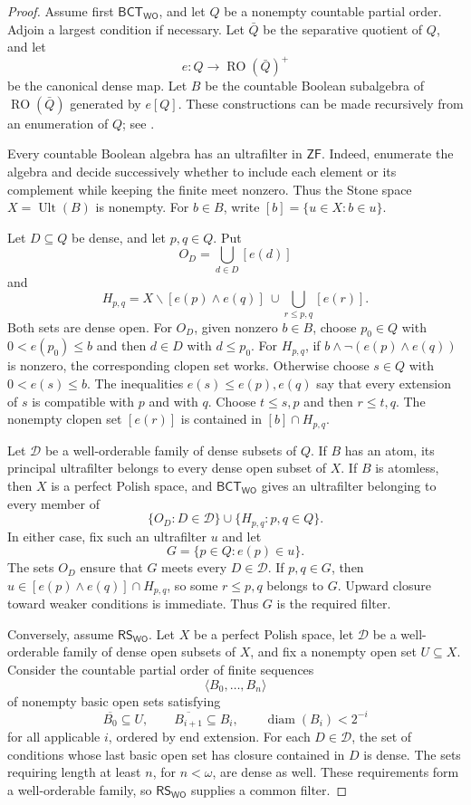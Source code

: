 \documentclass[11pt,reqno]{amsart}
\newcommand{\WO}{\mathsf{WO}}
\newcommand{\RO}{\operatorname{RO}}
\newcommand{\Ult}{\operatorname{Ult}}
\newcommand{\diam}{\operatorname{diam}}
\newcommand{\BCTWO}{\mathsf{BCT}_{\WO}}
\newcommand{\RSWO}{\mathsf{RS}_{\WO}}
\theoremstyle{plain}
\theoremstyle{definition}
\theoremstyle{remark}
\begin{document}
\begin{proof}
Assume first $\BCTWO$, and let $Q$ be a nonempty countable partial order.
Adjoin a largest condition if necessary.  Let $\bar Q$ be the separative
quotient of $Q$, and let
\[
 e:Q\longrightarrow\RO(\bar Q)^+
\]
be the canonical dense map.  Let $B$ be the countable Boolean subalgebra of
$\RO(\bar Q)$ generated by $e[Q]$.  These constructions can be made
recursively from an enumeration of $Q$; see \cite[Chapter 14]{Jech2003}.

Every countable Boolean algebra has an ultrafilter in $\mathsf{ZF}$.  Indeed,
enumerate the algebra and decide successively whether to include each element
or its complement while keeping the finite meet nonzero.  Thus the Stone
space $X=\Ult(B)$ is nonempty.  For $b\in B$, write
$[b]=\{u\in X:b\in u\}$.

Let $D\subseteq Q$ be dense, and let $p,q\in Q$.  Put
\[
 O_D=\bigcup_{d\in D}[e(d)]
\]
and
\[
 H_{p,q}=X\smallsetminus[e(p)\wedge e(q)]
 \ \cup\!\bigcup_{r\leq p,q}[e(r)].
\]
Both sets are dense open.  For $O_D$, given nonzero $b\in B$, choose
$p_0\in Q$ with $0<e(p_0)\leq b$ and then $d\in D$ with $d\leq p_0$.
For $H_{p,q}$, if
$b\wedge\neg(e(p)\wedge e(q))$ is nonzero, the corresponding clopen set
works.  Otherwise choose $s\in Q$ with $0<e(s)\leq b$.  The inequalities
$e(s)\leq e(p),e(q)$ say that every extension of $s$ is compatible with
$p$ and with $q$.  Choose $t\leq s,p$ and then $r\leq t,q$.  The nonempty
clopen set $[e(r)]$ is contained in $[b]\cap H_{p,q}$.

Let $\mathcal D$ be a well-orderable family of dense subsets of $Q$.  If $B$
has an atom, its principal ultrafilter belongs to every dense open subset of
$X$.  If $B$ is atomless, then $X$ is a perfect Polish space,
and $\BCTWO$ gives an ultrafilter belonging to every member of
\[
 \{O_D:D\in\mathcal D\}\cup\{H_{p,q}:p,q\in Q\}.
\]
In either case, fix such an ultrafilter $u$ and let
\[
 G=\{p\in Q:e(p)\in u\}.
\]
The sets $O_D$ ensure that $G$ meets every $D\in\mathcal D$.  If
$p,q\in G$, then $u\in[e(p)\wedge e(q)]\cap H_{p,q}$, so some
$r\leq p,q$ belongs to $G$.  Upward closure toward weaker conditions is
immediate.  Thus $G$ is the required filter.

Conversely, assume $\RSWO$.  Let $X$ be a perfect Polish
space, let $\mathcal D$ be a well-orderable family of dense open subsets of
$X$, and fix a nonempty open set $U\subseteq X$.  Consider the countable
partial order of finite sequences
\[
 \langle B_0,\dots,B_n\rangle
\]
of nonempty basic open sets satisfying
\[
 \overline{B_0}\subseteq U,\qquad
 \overline{B_{i+1}}\subseteq B_i,\qquad
 \diam(B_i)<2^{-i}
\]
for all applicable $i$, ordered by end extension.  For each
$D\in\mathcal D$, the set of conditions whose last basic open set has closure
contained in $D$ is dense.  The sets requiring length at least $n$, for
$n<\omega$, are dense as well.  These requirements form a well-orderable
family, so $\RSWO$ supplies a common filter.


\end{proof}
\end{document}
